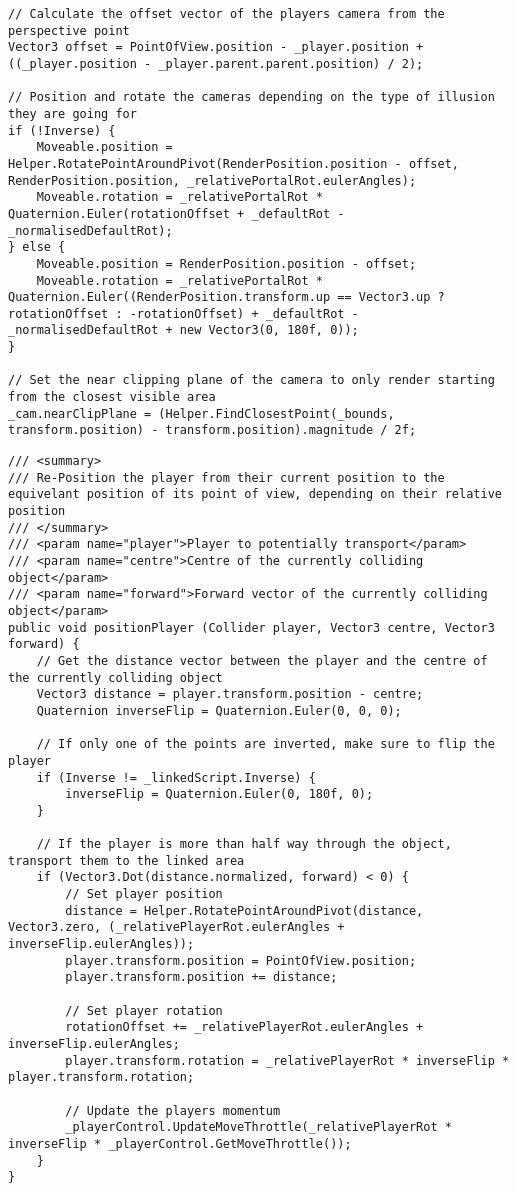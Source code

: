 		\begin{lstlisting}[caption="Camera Positioning - CameraRenderPosition.cs", label=appendix:code:camera, firstnumber=85]
// Calculate the offset vector of the players camera from the perspective point
Vector3 offset = PointOfView.position - _player.position + ((_player.position - _player.parent.parent.position) / 2);

// Position and rotate the cameras depending on the type of illusion they are going for
if (!Inverse) {
	Moveable.position = Helper.RotatePointAroundPivot(RenderPosition.position - offset, RenderPosition.position, _relativePortalRot.eulerAngles);
	Moveable.rotation = _relativePortalRot * Quaternion.Euler(rotationOffset + _defaultRot - _normalisedDefaultRot);
} else {
	Moveable.position = RenderPosition.position - offset;
	Moveable.rotation = _relativePortalRot * Quaternion.Euler((RenderPosition.transform.up == Vector3.up ? rotationOffset : -rotationOffset) + _defaultRot - _normalisedDefaultRot + new Vector3(0, 180f, 0));
}

// Set the near clipping plane of the camera to only render starting from the closest visible area
_cam.nearClipPlane = (Helper.FindClosestPoint(_bounds, transform.position) - transform.position).magnitude / 2f;
		\end{lstlisting}

		\begin{lstlisting}[caption="Player Positioning - CameraRenderPosition.cs", label=appendix:code:player, firstnumber=125]
/// <summary>
/// Re-Position the player from their current position to the equivelant position of its point of view, depending on their relative position
/// </summary>
/// <param name="player">Player to potentially transport</param>
/// <param name="centre">Centre of the currently colliding object</param>
/// <param name="forward">Forward vector of the currently colliding object</param>
public void positionPlayer (Collider player, Vector3 centre, Vector3 forward) {
	// Get the distance vector between the player and the centre of the currently colliding object
	Vector3 distance = player.transform.position - centre;
	Quaternion inverseFlip = Quaternion.Euler(0, 0, 0);

	// If only one of the points are inverted, make sure to flip the player
	if (Inverse != _linkedScript.Inverse) {
		inverseFlip = Quaternion.Euler(0, 180f, 0);
	}

	// If the player is more than half way through the object, transport them to the linked area
	if (Vector3.Dot(distance.normalized, forward) < 0) {
		// Set player position
		distance = Helper.RotatePointAroundPivot(distance, Vector3.zero, (_relativePlayerRot.eulerAngles + inverseFlip.eulerAngles));
		player.transform.position = PointOfView.position;
		player.transform.position += distance;

		// Set player rotation
		rotationOffset += _relativePlayerRot.eulerAngles + inverseFlip.eulerAngles;
		player.transform.rotation = _relativePlayerRot * inverseFlip * player.transform.rotation;

		// Update the players momentum
		_playerControl.UpdateMoveThrottle(_relativePlayerRot * inverseFlip * _playerControl.GetMoveThrottle());
	}
}
		\end{lstlisting}

